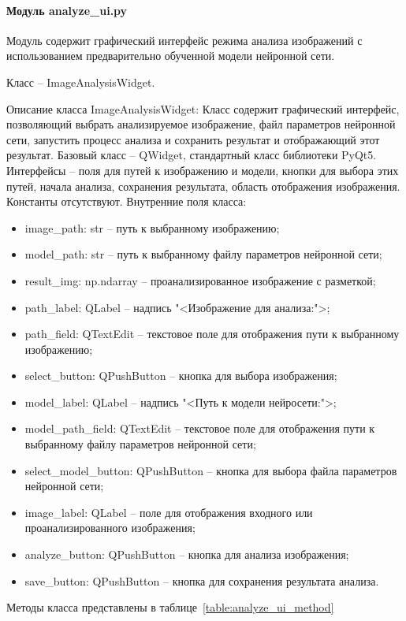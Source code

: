 \paragraph{Модуль analyze\_ui.py}

Модуль содержит графический интерфейс режима анализа изображений с использованием предварительно обученной модели нейронной сети.

Класс -- ImageAnalysisWidget. 

Описание класса ImageAnalysisWidget:
Класс содержит графический интерфейс, позволяющий выбрать анализируемое изображение, файл параметров нейронной сети, запустить процесс анализа и сохранить результат и отображающий этот результат. Базовый класс -- QWidget, стандартный класс библиотеки PyQt5. Интерфейсы -- поля для путей к изображению и модели, кнопки для выбора этих путей, начала анализа, сохранения результата, область отображения изображения. Константы отсутствуют. Внутренние поля класса:
\begin{itemize}
	\item image\_path: str -- путь к выбранному изображению;
	\item model\_path: str -- путь к выбранному файлу параметров нейронной сети;
	\item result\_img: np.ndarray -- проанализированное изображение с разметкой;
	\item path\_label: QLabel -- надпись "<Изображение для анализа:">;
	\item path\_field: QTextEdit -- текстовое поле для отображения пути к выбранному изображению;
	\item select\_button: QPushButton -- кнопка для выбора изображения;
	\item model\_label: QLabel -- надпись "<Путь к модели нейросети:">;
	\item model\_path\_field: QTextEdit -- текстовое поле для отображения пути к выбранному файлу параметров нейронной сети;
	\item select\_model\_button: QPushButton -- кнопка для выбора файла параметров нейронной сети;
	\item image\_label: QLabel -- поле для отображения входного или проанализированного изображения;
	\item analyze\_button: QPushButton -- кнопка для анализа изображения;
	\item save\_button: QPushButton -- кнопка для сохранения результата анализа.
\end{itemize}
Методы класса представлены в таблице~\ref{table:analyze_ui_method}

